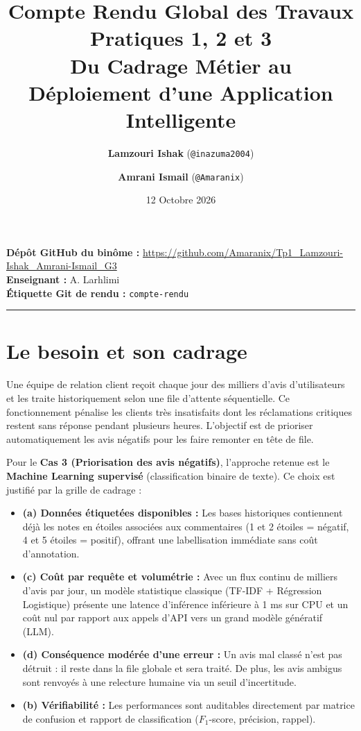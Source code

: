 \documentclass[11pt,a4paper]{article}
\title{\textbf{Compte Rendu Global des Travaux Pratiques 1, 2 et 3}\\\large Du Cadrage Métier au Déploiement d'une Application Intelligente}
\author{\textbf{Lamzouri Ishak} (\texttt{@inazuma2004}) \and \textbf{Amrani Ismail} (\texttt{@Amaranix})}
\date{12 Octobre 2026}
\begin{document}
\maketitle

\noindent\textbf{Dépôt GitHub du binôme :} \url{https://github.com/Amaranix/Tp1_Lamzouri-Ishak_Amrani-Ismail_G3}\\
\textbf{Enseignant :} A. Larhlimi\\
\textbf{Étiquette Git de rendu :} \texttt{compte-rendu}

\vspace{0.5cm}
\hrule
\vspace{0.5cm}

\section{Le besoin et son cadrage}

Une équipe de relation client reçoit chaque jour des milliers d'avis d'utilisateurs et les traite historiquement selon une file d'attente séquentielle. Ce fonctionnement pénalise les clients très insatisfaits dont les réclamations critiques restent sans réponse pendant plusieurs heures. L'objectif est de prioriser automatiquement les avis négatifs pour les faire remonter en tête de file.

Pour le \textbf{Cas 3 (Priorisation des avis négatifs)}, l'approche retenue est le \textbf{Machine Learning supervisé} (classification binaire de texte). Ce choix est justifié par la grille de cadrage :
\begin{itemize}
    \item \textbf{(a) Données étiquetées disponibles :} Les bases historiques contiennent déjà les notes en étoiles associées aux commentaires (1 et 2 étoiles = négatif, 4 et 5 étoiles = positif), offrant une labellisation immédiate sans coût d'annotation.
    \item \textbf{(c) Coût par requête et volumétrie :} Avec un flux continu de milliers d'avis par jour, un modèle statistique classique (TF-IDF + Régression Logistique) présente une latence d'inférence inférieure à 1 ms sur CPU et un coût nul par rapport aux appels d'API vers un grand modèle génératif (LLM).
    \item \textbf{(d) Conséquence modérée d'une erreur :} Un avis mal classé n'est pas détruit : il reste dans la file globale et sera traité. De plus, les avis ambigus sont renvoyés à une relecture humaine via un seuil d'incertitude.
    \item \textbf{(b) Vérifiabilité :} Les performances sont auditables directement par matrice de confusion et rapport de classification ($F_1$-score, précision, rappel).
\end{itemize}
\end{document}
